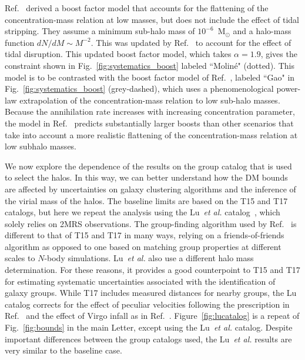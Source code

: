 Ref.~\cite{Sanchez-Conde:2013yxa} derived a boost factor model that accounts for the flattening of the concentration-mass relation at low masses, but does not include the effect of tidal stripping.  They assume a minimum sub-halo mass of $10^{-6}$~M$_\odot$ and a halo-mass function $dN/dM \sim M^{-2}$.  This was updated by Ref.~\cite{Moline:2016pbm} to account for the effect of tidal disruption. This updated boost factor model, which takes $\alpha = 1.9$, gives the constraint shown in Fig.~\ref{fig:systematics_boost} labeled ``Molin\'e" (dotted).  This model is to be contrasted with the boost factor model of Ref.~\cite{Gao:2011rf}, labeled ``Gao" in Fig.~\ref{fig:systematics_boost} (grey-dashed), which uses a phenomenological power-law extrapolation of the concentration-mass relation to low sub-halo masses.  Because the annihilation rate increases with increasing concentration parameter, the model in Ref.~\cite{Gao:2011rf} predicts substantially larger boosts than other scenarios that take into account a more realistic flattening of the concentration-mass relation at low subhalo masses.\vspace{0.1in}

We now explore the dependence of the results on the group catalog that is used to select the halos.  In this way, we can better understand how the DM bounds are affected by uncertainties on galaxy clustering algorithms and the inference of the virial mass of the halos.  The baseline limits are based on the T15 and T17 catalogs, but here we repeat the analysis using the Lu~\emph{et al.} catalog~\cite{Lu:2016vmu}, which solely relies on 2MRS observations.  The group-finding algorithm used by Ref.~\cite{Lu:2016vmu} is different to that of T15 and T17 in many ways, relying on a friends-of-friends algorithm as opposed to one based on matching group properties at different scales to $N$-body simulations. Lu~\emph{et al.} also use a different halo mass determination.  For these reasons, it provides a good counterpoint to T15 and T17 for estimating systematic uncertainties associated with the identification of galaxy groups. While T17 includes measured distances for nearby groups, the Lu catalog corrects for the effect of peculiar velocities following the prescription in Ref.~\cite{1996AJ....111..794K} and the effect of Virgo infall as in Ref.~\cite{2014ApJ...782....4K}. Figure~\ref{fig:lucatalog} is a repeat of Fig.~\ref{fig:bounds} in the main Letter, except using the Lu~\emph{et al.} catalog.  Despite important differences between the group catalogs used, the Lu~\emph{et al.} results are very similar to the baseline case. \\

